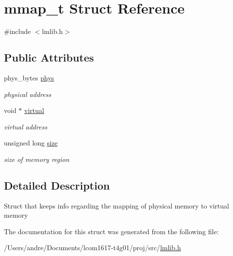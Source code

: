 \hypertarget{structmmap__t}{}\section{mmap\+\_\+t Struct Reference}
\label{structmmap__t}


{\ttfamily \#include $<$lmlib.\+h$>$}

\subsection*{Public Attributes}
\begin{DoxyCompactItemize}
\item 
phys\+\_\+bytes \hyperlink{group__lmlib_gaa6ac1ee0e0fadea4a4f85b48c8359ae4}{phys}
\begin{DoxyCompactList}\small\item\em physical address \end{DoxyCompactList}\item 
void $\ast$ \hyperlink{group__lmlib_ga4de93144fb3ffbceb9bd1f3009d6d98c}{virtual}
\begin{DoxyCompactList}\small\item\em virtual address \end{DoxyCompactList}\item 
unsigned long \hyperlink{group__lmlib_gaf1cdc5384a402fddf33f400a5e1e5e45}{size}
\begin{DoxyCompactList}\small\item\em size of memory region \end{DoxyCompactList}\end{DoxyCompactItemize}


\subsection{Detailed Description}
Struct that keeps info regarding the mapping of physical memory to virtual memory 

The documentation for this struct was generated from the following file\+:\begin{DoxyCompactItemize}
\item 
/\+Users/andre/\+Documents/lcom1617-\/t4g01/proj/src/\hyperlink{lmlib_8h}{lmlib.\+h}\end{DoxyCompactItemize}
